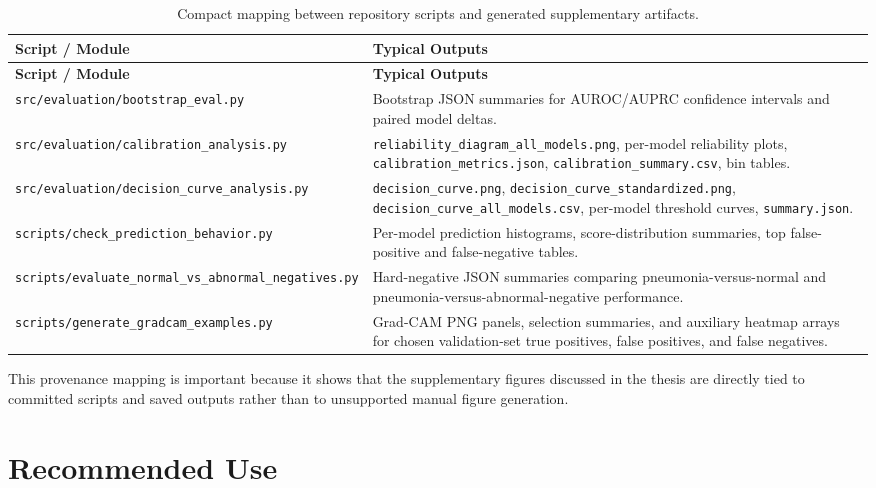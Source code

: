\renewcommand{\arraystretch}{1.15}
\small
\begin{longtable}{p{5.0cm} p{8.5cm}}
\caption{Compact mapping between repository scripts and generated supplementary artifacts.}
\label{tab:appendix_artifact_provenance} \\
\toprule
\textbf{Script / Module} & \textbf{Typical Outputs} \\
\midrule
\endfirsthead

\toprule
\textbf{Script / Module} & \textbf{Typical Outputs} \\
\midrule
\endhead

\texttt{src/evaluation/bootstrap\_eval.py} &
Bootstrap JSON summaries for AUROC/AUPRC confidence intervals and paired model deltas. \\

\texttt{src/evaluation/calibration\_analysis.py} &
\texttt{reliability\_diagram\_all\_models.png}, per-model reliability plots, \texttt{calibration\_metrics.json}, \texttt{calibration\_summary.csv}, bin tables. \\

\texttt{src/evaluation/decision\_curve\_analysis.py} &
\texttt{decision\_curve.png}, \texttt{decision\_curve\_standardized.png}, \texttt{decision\_curve\_all\_models.csv}, per-model threshold curves, \texttt{summary.json}. \\

\texttt{scripts/check\_prediction\_behavior.py} &
Per-model prediction histograms, score-distribution summaries, top false-positive and false-negative tables. \\

\texttt{scripts/evaluate\_normal\_vs\_abnormal\_negatives.py} &
Hard-negative JSON summaries comparing pneumonia-versus-normal and pneumonia-versus-abnormal-negative performance. \\

\texttt{scripts/generate\_gradcam\_examples.py} &
Grad-CAM PNG panels, selection summaries, and auxiliary heatmap arrays for chosen validation-set true positives, false positives, and false negatives. \\
\bottomrule
\end{longtable}
\normalsize

This provenance mapping is important because it shows that the supplementary figures discussed in the thesis are directly tied to committed scripts and saved outputs rather than to unsupported manual figure generation.

\section{Recommended Use}

